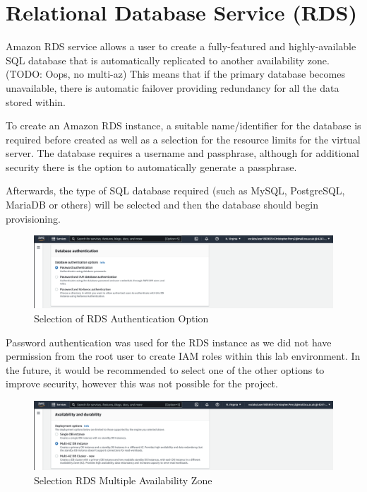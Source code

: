 \chapter{Relational Database Service (RDS)}\label{ch:relational-database-service}
Amazon RDS service allows a user to create a fully-featured and highly-available SQL database that is automatically
replicated to another availability zone. (TODO: Oops, no multi-az) This means that if the primary database becomes
unavailable, there is automatic failover providing redundancy for all the data stored within.

To create an Amazon RDS instance, a suitable name/identifier for the database is required before created as well as a
selection for the resource limits for the virtual server.
The database requires a username and passphrase, although for additional security there is the option to automatically
generate a passphrase.

Afterwards, the type of SQL database required (such as MySQL, PostgreSQL, MariaDB or others) will be selected and then
the database should begin provisioning.

\begin{figure}[!htbp]
    \centering
    \includegraphics[width=\textwidth]{resources/rds/rds-authentication.png}
    \caption{Selection of RDS Authentication Option}
    \label{fig:rds-auth}
\end{figure}

Password authentication was used for the RDS instance as we did not have permission from the root user to create IAM roles within this lab environment. In the future, it would be recommended to select one of the other options to improve security, however this was not possible for the project.

\begin{figure}[!htbp]
    \centering
    \includegraphics[width=\textwidth]{resources/rds/rds-availability-durability.png}
    \caption{Selection RDS Multiple Availability Zone}
    \label{fig:rds-avail}
\end{figure}


